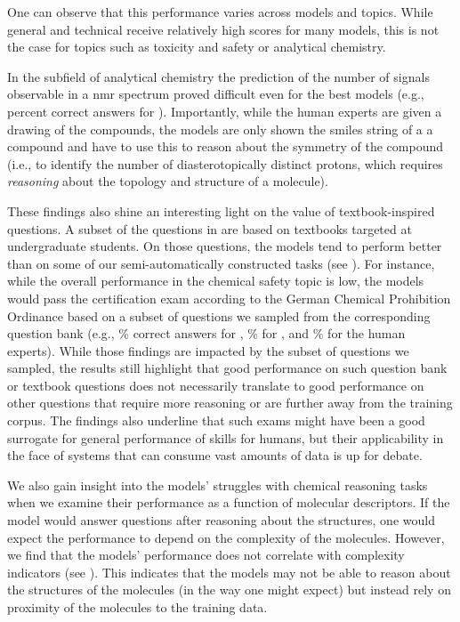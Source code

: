 \documentclass[11pt, oneside]{article}
\begin{document}
\begin{refsection}
One can observe that this performance varies across models and topics.
While general and technical receive relatively high scores for many models, this is not the case for topics such as toxicity and safety or analytical chemistry.

In the subfield of analytical chemistry the prediction of the number of signals observable in a \gls{nmr} spectrum proved difficult even for the best models (e.g.,  percent correct answers for \oone).
Importantly, while the human experts are given a drawing of the compounds, the models are only shown the \gls{smiles} string of a a compound and have to use this to reason about the symmetry of the compound (i.e., to identify the number of diasterotopically distinct protons, which requires \emph{reasoning} about the topology and structure of a molecule).

 These findings also shine an interesting light on the value of textbook-inspired questions.
 A subset of the questions in \chembench are based on textbooks targeted at undergraduate students.
 On those questions, the models tend to perform better than on some of our semi-automatically constructed tasks (see ).
 For instance, while the overall performance in the chemical safety topic is low, the models would pass the certification exam according to the German Chemical Prohibition Ordinance based on a subset of questions we sampled from the corresponding question bank (e.g., \% correct answers for \GPTFour, \% for \ClaudeThreeFiveSonnet, and \% for the human experts).
 While those findings are impacted by the subset of questions we sampled, the results still highlight that good performance on such question bank or textbook questions does not necessarily translate to good performance on other questions that require more reasoning or are further away from the training corpus.\autocite{mccoy2023embersautoregressionunderstandinglarge} The findings also underline that such exams might have been a good surrogate for general performance of skills for humans, but their applicability in the face of systems that can consume vast amounts of data is up for debate.

 We also gain insight into the models' struggles with chemical reasoning tasks when we examine their performance as a function of molecular descriptors.
 If the model would answer questions after reasoning about the structures, one would expect the performance to depend on the complexity of the molecules.
 However, we find that the models' performance does not correlate with complexity indicators (see ).
 This indicates that the models may not be able to reason about the structures of the molecules (in the way one might expect) but instead rely on proximity of the molecules to the training data.\autocite{mccoy2023embersautoregressionunderstandinglarge}


\end{refsection}
\end{document}
